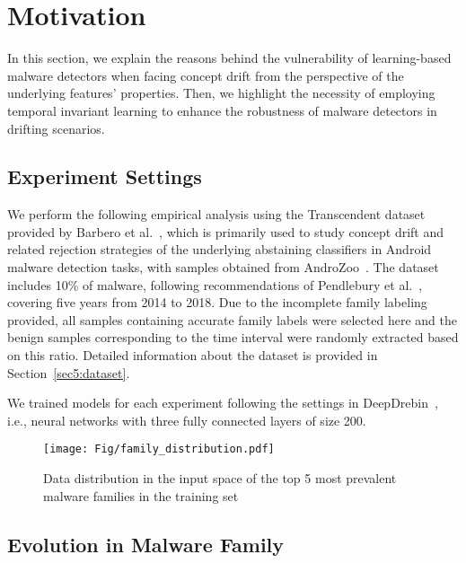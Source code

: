 \section{Motivation}

In this section, we explain the reasons behind the vulnerability of learning-based malware detectors when facing concept drift from the perspective of the underlying features' properties. Then, we highlight the necessity of employing temporal invariant learning to enhance the robustness of malware detectors in drifting scenarios. 

\subsection{Experiment Settings}

We perform the following empirical analysis using the Transcendent dataset provided by Barbero et al.~\cite{transcending}, which is primarily used to study concept drift and related rejection strategies of the underlying abstaining classifiers in Android malware detection tasks, with samples obtained from AndroZoo~\cite{androzoo}. The dataset includes 10\% of malware, following recommendations of Pendlebury et al.~\cite{tesseract}, covering five years from 2014 to 2018. Due to the incomplete family labeling provided, all samples containing accurate family labels were selected here and the benign samples corresponding to the time interval were randomly extracted based on this ratio. Detailed information about the dataset is provided in Section~\ref{sec5:dataset}. 

We trained models for each experiment following the settings in DeepDrebin~\cite{deepdrebin}, i.e., neural networks with three fully connected layers of size 200.

\begin{figure*}
    \centering
    \setlength{\abovecaptionskip}{0.cm}
    \texttt{[image: Fig/family\_distribution.pdf]}
    \caption{Data distribution in the input space of the top 5 most prevalent malware families in the training set}
    \label{fig:family_distribution}
\end{figure*}

\subsection{Evolution in Malware Family}

